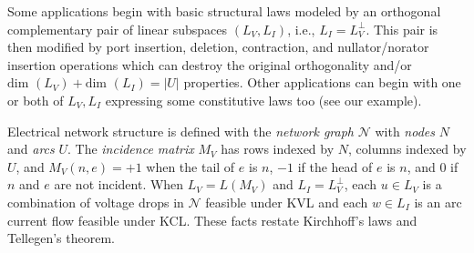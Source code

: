 \documentclass{article}
\def\Reals{\ensuremath{\mathbf R}}
\newcommand{\extra}[1]{}
\begin{document}
Some applications begin with basic structural laws
modeled by an orthogonal complementary pair of 
linear subspaces $(L_V, L_I)$, i.e., $L_I=L_V^\perp$.  This pair 
is then modified by port insertion, deletion, contraction, and 
nullator/norator insertion operations which can 
destroy the original orthogonality and/or 
$\mbox{dim\ }(L_V)+\mbox{dim\ }(L_I)=|U|$ properties.
Other applications can begin with one or both of $L_V,L_I$ 
expressing some constitutive laws too (see our example).

Electrical network structure is defined 
with the \textit{network graph}
$\mathcal{N}$ with \textit{nodes} $N$  and \textit{arcs} $U$.  
The \textit{incidence matrix} $M_V$ has rows indexed by $N$,
columns indexed by $U$, and $M_V(n,e)=+1$ when the tail of $e$ is
$n$, $-1$ if the head of $e$ is $n$, and $0$ if $n$ and $e$ are not incident.
When $L_V=L(M_V)$ and $L_I=L_V^\perp$,
each $u\in L_V$ is a combination of voltage drops in $\mathcal{N}$ 
feasible under KVL and each $w\in L_I$ is 
an arc current flow feasible under KCL.  These facts 
restate Kirchhoff's laws and Tellegen's theorem.  

\extra{ 
We can determine
$(L_V, L_I)$ from one of these subspaces given and Tellegen's theorem: The
role of nodes here is not strictly necessary.
Kirchhoff's voltage law can be expressed by the statement:  
The feasible voltage drops are the image of the map 
$\Reals^N\rightarrow\Reals^U$ given by $\phi\rightarrow\phi M_V$.  
Kirchhoff's current law says the feasible current flows are the kernel
of the map $\Reals^U\rightarrow\Reals^N$ given by $u\rightarrow u M_I^t$.
Tellegen's theorem is the observation that $M_V$ and $M_I^t$ are adjoints.
See \cite{WyattTele}.}

\extra{
A practical and familiar way to generate $M_V$ and $M_I$ matrices whose rows 
provide some covectors to use for qualitative analysis is to 
chose a spanning set of (directed) cuts and cycles respectively, say
the fundamental cutsets and cycles of a spanning tree.  A single spanning
tree however
for both $M_V$ and $M_I$ is not necessary.  There is no advantage, at 
least for hand calculations, for $M_V$ and $M_I$ to have the minimum
number of rows.  Particular cutsets and cycles, or linear combinations of
them, can be devised and used to provide covectors that represent
approximations of particular ``modes'' of system operation or change 
from one operating point to another.}
\end{document}
